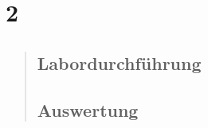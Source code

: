 \section{2}
\begin{quote}
    
    
    \subsection{Labordurchführung}
    \begin{quote}
        
        
    \end{quote}
    
    
    
    
    
    \subsection{Auswertung}
    \begin{quote}
        
    \end{quote}
    
\end{quote}



%     
%         

% 
% 
% 




